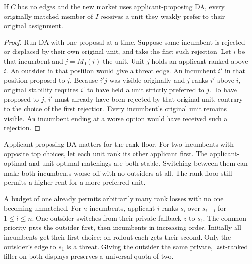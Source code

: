 \begin{corollary}\label{cor:guard-rank}
If $C$ has no edges and the new market uses applicant-proposing DA,
every originally matched member of $I$ receives a unit they weakly
prefer to their original assignment.
\end{corollary}
\begin{proof}
Run DA with one proposal at a time. Suppose some incumbent is rejected or
displaced by their own original unit, and take the first such rejection.
Let $i$ be that incumbent and $j=M_0(i)$ the unit. Unit $j$ holds an
applicant ranked above $i$. An outsider in that position would give a
threat edge. An incumbent $i'$ in that position proposed to $j$. Because
$i'j$ was visible originally and $j$ ranks $i'$ above $i$, original stability
requires $i'$ to have held a unit strictly preferred to $j$. To have proposed
to $j$, $i'$ must already have been rejected by that original unit, contrary
to the choice of the first rejection. Every incumbent's original unit remains
visible. An incumbent ending at a worse option would have received such a
rejection.
\end{proof}
Applicant-proposing DA matters for the rank floor. For two incumbents with
opposite top choices, let each unit rank its other applicant first. The
applicant-optimal and unit-optimal matchings are both stable. Switching
between them can make both incumbents worse off with no outsiders at all.
The rank floor still permits a higher rent for a more-preferred unit.

A budget of one already permits arbitrarily many rank losses with no one
becoming unmatched. For $n$ incumbents, applicant $i$ ranks $s_i$ over
$s_{i+1}$ for $1\le i\le n$. One outsider switches from their private
fallback $z$ to $s_1$. The common priority puts the outsider first, then
incumbents in increasing order. Initially all incumbents get their first
choice; on rollout each gets their second. Only the outsider's edge to $s_1$
is a threat. Giving the outsider the same private, last-ranked filler on both
displays preserves a universal quota of two.

